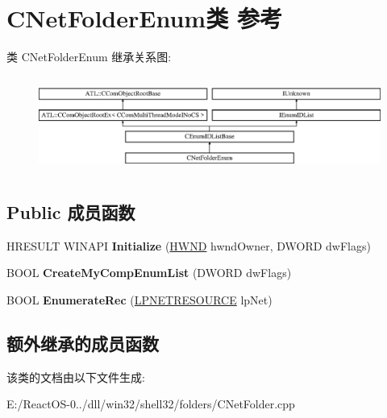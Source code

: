\hypertarget{class_c_net_folder_enum}{}\section{C\+Net\+Folder\+Enum类 参考}
\label{class_c_net_folder_enum}
类 C\+Net\+Folder\+Enum 继承关系图\+:\begin{figure}[H]
\begin{center}
\leavevmode
\includegraphics[height=3.181818cm]{class_c_net_folder_enum}
\end{center}
\end{figure}
\subsection*{Public 成员函数}
\begin{DoxyCompactItemize}
\item 
\mbox{\label{class_c_net_folder_enum_a8552b14d7414f4bd8eb19751ec5eec5b}} 
H\+R\+E\+S\+U\+LT W\+I\+N\+A\+PI {\bfseries Initialize} (\hyperlink{interfacevoid}{H\+W\+ND} hwnd\+Owner, D\+W\+O\+RD dw\+Flags)
\item 
\mbox{\label{class_c_net_folder_enum_aefa534988166109e38cb7241575cfdfb}} 
B\+O\+OL {\bfseries Create\+My\+Comp\+Enum\+List} (D\+W\+O\+RD dw\+Flags)
\item 
\mbox{\label{class_c_net_folder_enum_a7b8204663e5f99d3495bf2d4341633f9}} 
B\+O\+OL {\bfseries Enumerate\+Rec} (\hyperlink{struct___n_e_t_r_e_s_o_u_r_c_e_a}{L\+P\+N\+E\+T\+R\+E\+S\+O\+U\+R\+CE} lp\+Net)
\end{DoxyCompactItemize}
\subsection*{额外继承的成员函数}


该类的文档由以下文件生成\+:\begin{DoxyCompactItemize}
\item 
E\+:/\+React\+O\+S-\/0../dll/win32/shell32/folders/C\+Net\+Folder.\+cpp\end{DoxyCompactItemize}
